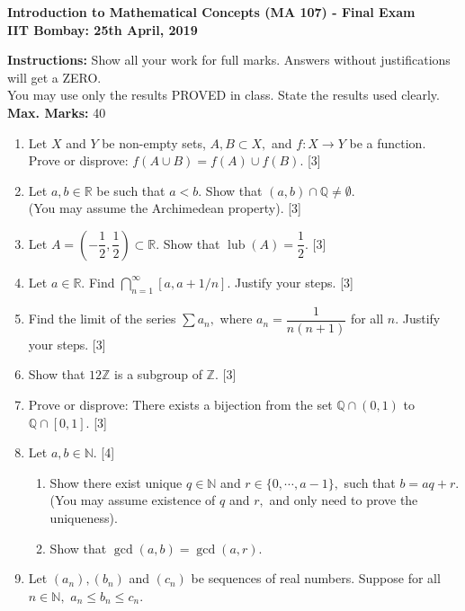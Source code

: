 \documentclass{article}
\title{}
\author{}
\date{}
\begin{document}
\begin{center}
	\begin{large}
		\textbf{Introduction to Mathematical Concepts (MA 107) - Final Exam}\\
		\textbf{IIT Bombay: 25th April, 2019}\\
	\end{large}
	\textbf{Instructions:} Show all your work for full marks. Answers without justifications will get a ZERO.\\
	You may use only the results PROVED in class. State the results used clearly. \textbf{Max. Marks:} 40
\end{center}
\begin{enumerate}[label = (\arabic*)] 
	\item Let $X$ and $Y$ be non-empty sets, $A, B \subset X,$ and $f:X\to Y$ be a function.\\
	Prove or disprove: $f(A\cup B) = f(A) \cup f(B).$ \hfill [3]
	\item Let $a, b \in \mathbb{R}$ be such that $a < b.$ Show that $(a, b) \cap \mathbb{Q} \neq \emptyset.$\\
	(You may assume the Archimedean property). \hfill [3]
	\item Let $A = \left(-\dfrac{1}{2}, \dfrac{1}{2}\right) \subset \mathbb{R}.$ Show that $\operatorname{lub}(A) = \dfrac{1}{2}.$ \hfill [3]
	\item Let $a \in \mathbb{R}.$ Find $\displaystyle\bigcap_{n=1}^\infty[a, a+1/n].$ Justify your steps. \hfill [3]
	\item Find the limit of the series $\sum a_n,$ where $a_n = \dfrac{1}{n(n+1)}$ for all $n.$ Justify your steps. \hfill [3]
	\item Show that $12\mathbb{Z}$ is a subgroup of $\mathbb{Z}.$ \hfill [3]
	\item Prove or disprove: There exists a bijection from the set $\mathbb{Q}\cap(0, 1)$ to $\mathbb{Q}\cap[0, 1].$ \hfill [3]
	\item Let $a, b \in \mathbb{N}.$ \hfill [4]
	\begin{enumerate}[nosep] 
		\item Show there exist unique $q \in \mathbb{N}$ and $r \in \{0, \cdots, a-1\},$ such that $b = aq + r.$\\
		(You may assume existence of $q$ and $r,$ and only need to prove the uniqueness).
		\item Show that $\gcd(a, b) = \gcd(a, r).$
	\end{enumerate}
	\item Let $(a_n), (b_n)$ and $(c_n)$ be sequences of real numbers. Suppose for all $n \in \mathbb{N},$ $a_n \le b_n \le c_n.$\\

\end{enumerate}
\end{document}
